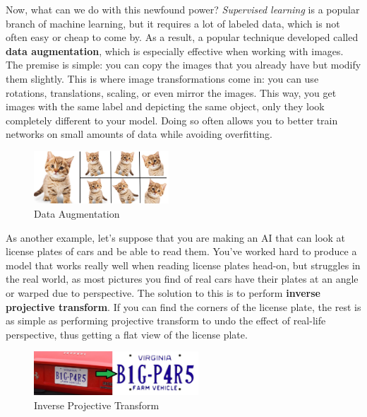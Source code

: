 \documentclass{article}
\begin{document}
Now, what can we do with this newfound power? \textit{Supervised learning} is a popular branch of machine learning, but it requires a lot of labeled data, which is not often easy or cheap to come by. As a result, a popular technique developed called \textbf{data augmentation}, which is especially effective when working with images. The premise is simple: you can copy the images that you already have but modify them slightly. This is where image transformations come in: you can use rotations, translations, scaling, or even mirror the images. This way, you get images with the same label and depicting the same object, only they look completely different to your model. Doing so often allows you to better train networks on small amounts of data while avoiding overfitting.

\begin{figure}[!htb]
    \begin{center}
        \includegraphics[width=0.45\textwidth]{kitty_augmentation.png}
        \vspace{-20pt}
    \end{center}
    \caption{Data Augmentation}
\end{figure}

As another example, let's suppose that you are making an AI that can look at license plates of cars and be able to read them. You've worked hard to produce a model that works really well when reading license plates head-on, but struggles in the real world, as most pictures you find of real cars have their plates at an angle or warped due to perspective. The solution to this is to perform \textbf{inverse projective transform}. If you can find the corners of the license plate, the rest is as simple as performing projective transform to undo the effect of real-life perspective, thus getting a flat view of the license plate.

\begin{figure}[!htb]
    \begin{center}
        \includegraphics[width=0.55\textwidth]{ferrari2.jpg}
        \vspace{-20pt}
    \end{center}
    \caption{Inverse Projective Transform}
\end{figure}
\end{document}
